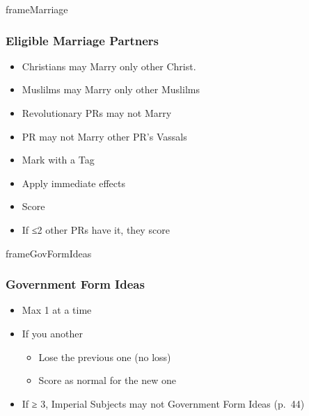\documentclass[10pt]{article}
\newlength{\fhMarriage} \setlength\fhMarriage{5\baselineskip}
\newlength{\fhGovFormIdeas} \setlength\fhGovFormIdeas{7\baselineskip}
\begin{document}
\begin{dynamiccontents*}{frameMarriage}\begin{eubox}{\fhMarriage}
	\subsubsection*{Eligible Marriage Partners }
	\begin{itemize}
		\item Christians may Marry only other Christ.
		\item Muslilms may Marry only other Muslilms
		\item Revolutionary PRs may not Marry
		\item PR may not Marry other PR's Vassals
	\end{itemize}
\end{eubox}\end{dynamiccontents*}

\begin{itemize}
	\item Mark with a Tag
	\item Apply immediate effects
	\item Score 
	\item If ≤2 other PRs have it, they score 
\end{itemize}
\begin{dynamiccontents*}{frameGovFormIdeas}\begin{eubox}{\fhGovFormIdeas}
	\subsubsection*{Government Form Ideas }
	\begin{itemize}
		\item Max 1 at a time
		\item If you  another
		\begin{itemize}
			\item Lose the previous one (no \prestige loss)
			\item Score \prestige as normal for the new one
		\end{itemize}
		\item If \authority ≥ 3, Imperial Subjects may not  Government Form Ideas (p.~44)
	\end{itemize}
\end{eubox}\end{dynamiccontents*}
\end{document}
